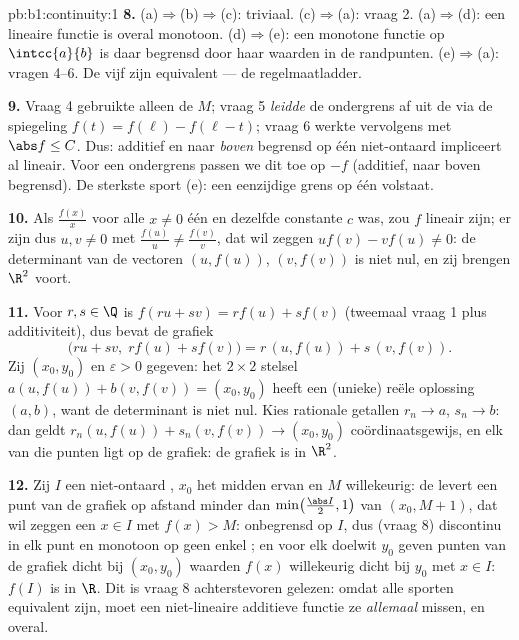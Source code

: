 \begin{solution}{pb:b1:continuity:1}
\textbf{8.} (a)$\Rightarrow$(b)$\Rightarrow$(c): triviaal.
(c)$\Rightarrow$(a): vraag 2. (a)$\Rightarrow$(d): een lineaire
functie is overal monotoon. (d)$\Rightarrow$(e): een monotone
functie op $\intcc{a}{b}$ is daar begrensd door haar waarden in de
randpunten. (e)$\Rightarrow$(a): vragen 4--6. De vijf 
zijn equivalent --- de regelmaatladder.

\textbf{9.} Vraag 4 gebruikte alleen de  $M$; vraag 5
\emph{leidde} de ondergrens af uit de  via de spiegeling
$f(t) = f(\ell) - f(\ell - t)$; vraag 6 werkte vervolgens met
$\abs f \leq C$. Dus: additief en naar \emph{boven} begrensd op één
niet-ontaard  impliceert al lineair. Voor een ondergrens
passen we dit toe op $-f$ (additief, naar boven begrensd). De
sterkste sport (e): een eenzijdige grens op één  volstaat.

\textbf{10.} Als $\frac{f(x)}{x}$ voor alle $x \neq 0$ één en
dezelfde constante $c$ was, zou $f$ lineair zijn; er zijn dus $u, v
\neq 0$ met $\frac{f(u)}u \neq \frac{f(v)}v$, dat wil zeggen $u f(v)
- v f(u) \neq 0$: de determinant van de vectoren $(u, f(u))$, $(v,
f(v))$ is niet nul, en zij brengen $\R^2$ voort.

\textbf{11.} Voor $r, s \in \Q$ is $f(ru + sv) = r f(u) + s f(v)$
(tweemaal vraag 1 plus additiviteit), dus bevat de grafiek
\[
\bigl(ru + sv,\; r f(u) + s f(v)\bigr)
= r\,(u, f(u)) + s\,(v, f(v)) .
\]
Zij $(x_0, y_0)$ en $\varepsilon > 0$ gegeven: het $2 \times 2$
stelsel $a(u, f(u)) + b(v, f(v)) = (x_0, y_0)$ heeft een (unieke)
reële oplossing $(a, b)$, want de determinant is niet nul. Kies
rationale getallen $r_n \to a$, $s_n \to b$: dan geldt $r_n(u, f(u))
+ s_n(v, f(v)) \to (x_0, y_0)$ coördinaatsgewijs, en elk van die
punten ligt op de grafiek: de grafiek is  in $\R^2$.

\textbf{12.} Zij $I$ een niet-ontaard , $x_0$ het midden
ervan en $M$ willekeurig: de  levert een punt van de
grafiek op afstand minder dan $\min\bigl(\frac{\abs I}{2}, 1\bigr)$
van $(x_0, M + 1)$, dat wil zeggen een $x \in I$ met $f(x) > M$:
onbegrensd op $I$, dus (vraag 8) discontinu in elk punt en monotoon
op geen enkel ; en voor elk doelwit $y_0$ geven punten van
de grafiek dicht bij $(x_0, y_0)$ waarden $f(x)$ willekeurig dicht
bij $y_0$ met $x \in I$: $f(I)$ is  in $\R$. Dit is vraag 8
achterstevoren gelezen: omdat alle sporten equivalent zijn, moet
een niet-lineaire additieve functie ze \emph{allemaal} missen, en
overal.


\end{solution}
